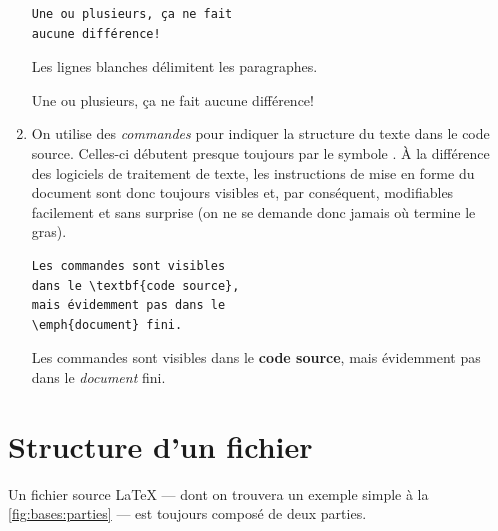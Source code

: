 \begin{enumerate}
\begin{demo}
\begin{texample}
\begin{lstlisting}
Une ou plusieurs, ça ne fait
aucune différence!
\end{lstlisting}
      \producing
        Les lignes blanches  délimitent
        les paragraphes.



        Une ou plusieurs, ça ne fait aucune différence!
    \end{texample}
  \end{demo}
%
\item On utilise des \emph{commandes} pour indiquer la structure du
  texte dans le code source. Celles-ci débutent presque toujours par
  le symbole {\bs}. À la différence des logiciels de traitement de
  texte, les instructions de mise en forme du document sont donc
  toujours visibles et, par conséquent, modifiables facilement et sans
  surprise (on ne se demande donc jamais où termine le gras).
  \begin{demo}
    \begin{texample}
\begin{lstlisting}
Les commandes sont visibles
dans le \textbf{code source},
mais évidemment pas dans le
\emph{document} fini.
\end{lstlisting}
      \producing
      Les commandes sont visibles
      dans le \textbf{code source},
      mais évidemment pas dans le
      \emph{document} fini.
    \end{texample}
  \end{demo}
\end{enumerate}


\section{Structure d'un fichier}
\label{sec:bases:structure}

Un fichier source {\LaTeX} --- dont on trouvera un exemple simple à la
\autoref{fig:bases:parties} --- est toujours composé de deux parties.

